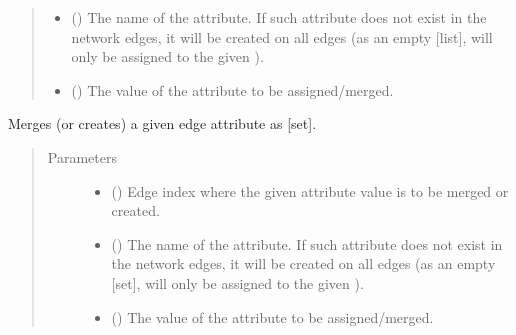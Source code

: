 \documentclass[letterpaper,10pt,english]{sphinxmanual}
\begin{document}
\begin{fulllineitems}
\begin{fulllineitems}
\begin{quote}
\begin{description}
\begin{itemize}
\item {} 
 () \textendash{} The name of the attribute. If such attribute does not exist
in the network edges, it will be created on all edges (as an
empty {[}list{]},  will only be assigned to the given
).

\item {} 
 () \textendash{} The value of the attribute to be assigned/merged.

\end{itemize}

\end{description}\end{quote}

\end{fulllineitems}


\begin{fulllineitems}
\label{\detokenize{reference:pypath.main.PyPath.add_set_eattr}}
Merges (or creates) a given edge attribute as {[}set{]}.
\begin{quote}\begin{description}
\item[{Parameters}] \leavevmode\begin{itemize}
\item {} 
 () \textendash{} Edge index where the given attribute value is to be merged
or created.

\item {} 
 () \textendash{} The name of the attribute. If such attribute does not exist
in the network edges, it will be created on all edges (as an
empty {[}set{]},  will only be assigned to the given
).

\item {} 
 () \textendash{} The value of the attribute to be assigned/merged.


\end{itemize}
\end{description}
\end{quote}
\end{fulllineitems}
\end{fulllineitems}
\end{document}
